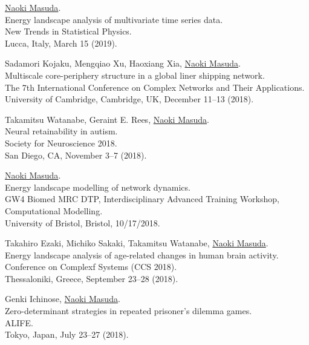 \documentclass[11pt,letter]{article}
\begin{document}
\begin{etaremune}
\item \underline{Naoki Masuda}.\\
Energy landscape analysis of multivariate time series data.\\
New Trends in Statistical Physics.\\
Lucca, Italy, March 15 (2019).


\item Sadamori Kojaku, Mengqiao Xu, Haoxiang Xia, \underline{Naoki Masuda}.\\
Multiscale core-periphery structure in a global liner shipping network.\\
The 7th International Conference on Complex Networks and Their Applications.\\
University of Cambridge, Cambridge, UK, December 11--13 (2018).

\item Takamitsu Watanabe, Geraint E. Rees, \underline{Naoki Masuda}.\\
Neural retainability in autism.\\
Society for Neuroscience 2018.\\
San Diego, CA, November 3--7 (2018).

\item \underline{Naoki Masuda}.\\
Energy landscape modelling of network dynamics.\\
GW4 Biomed MRC DTP, Interdisciplinary Advanced Training Workshop, Computational Modelling.\\
University of Bristol, Bristol, 10/17/2018.

\item Takahiro Ezaki, Michiko Sakaki, Takamitsu Watanabe, \underline{Naoki Masuda}.\\
Energy landscape analysis of age-related changes in human brain activity.\\
Conference on Complexf Systems (CCS 2018).\\
Thessaloniki, Greece, September 23--28 (2018).

\item Genki Ichinose, \underline{Naoki Masuda}.\\
Zero-determinant strategies in repeated prisoner’s dilemma games.\\
ALIFE.\\
Tokyo, Japan, July 23--27 (2018).


\end{etaremune}
\end{document}
